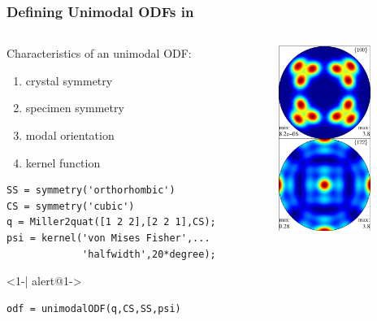\begin{frame}[fragile]
  \frametitle{Defining Unimodal ODFs in \MTEX}

\begin{columns}

  \begin{column}{8.5cm}

      Characteristics of an unimodal ODF:
      \begin{enumerate}
      \item crystal symmetry
      \item specimen symmetry
      \item modal orientation
      \item kernel function
      \end{enumerate}



\begin{lstlisting}
SS = symmetry('orthorhombic')
CS = symmetry('cubic')
q = Miller2quat([1 2 2],[2 2 1],CS);
psi = kernel('von Mises Fisher',...
             'halfwidth',20*degree);
\end{lstlisting}

      \begin{actionenv}<1-| alert@1->
\begin{lstlisting}
odf = unimodalODF(q,CS,SS,psi)
\end{lstlisting}
    \end{actionenv}

\end{column}

    \begin{column}{3cm}
      \includegraphics[width=3cm]{pic/unimodalODF}
    \end{column}
  \end{columns}

\end{frame}



